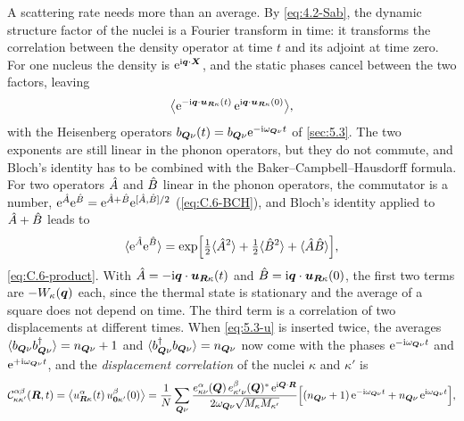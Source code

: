 A scattering rate needs more than an average. By \cref{eq:4.2-Sab}, the dynamic structure factor of the nuclei is a Fourier transform in time: it transforms the correlation between the density operator at time $t$ and its adjoint at time zero. For one nucleus the density is $\mathrm{e}^{\mathrm{i}\bm{q}\cdot\bm{X}}$, and the static phases cancel between the two factors, leaving
\begin{equation*}
  \bigl\langle\mathrm{e}^{-\mathrm{i}\bm{q}\cdot\bm{u}_{\bm{R}\kappa}(t)}\,\mathrm{e}^{\mathrm{i}\bm{q}\cdot\bm{u}_{\bm{R}\kappa}(0)}\bigr\rangle ,
\end{equation*}
with the Heisenberg operators $b_{\bm{Q}\nu}(t) = b_{\bm{Q}\nu}\mathrm{e}^{-\mathrm{i}\omega_{\bm{Q}\nu}t}$ of \cref{sec:5.3}. The two exponents are still linear in the phonon operators, but they do not commute, and Bloch's identity has to be combined with the Baker--Campbell--Hausdorff formula. For two operators $\hat{A}$ and $\hat{B}$ linear in the phonon operators, the commutator is a number, $\mathrm{e}^{\hat{A}}\mathrm{e}^{\hat{B}} = \mathrm{e}^{\hat{A} + \hat{B}}\mathrm{e}^{[\hat{A}, \hat{B}]/2}$ (\cref{eq:C.6-BCH}), and Bloch's identity applied to $\hat{A} + \hat{B}$ leads to
\begin{equation*}
  \langle\mathrm{e}^{\hat{A}}\mathrm{e}^{\hat{B}}\rangle = \exp\Bigl[\tfrac12\langle\hat{A}^2\rangle + \tfrac12\langle\hat{B}^2\rangle + \langle\hat{A}\hat{B}\rangle\Bigr] ,
\end{equation*}
\cref{eq:C.6-product}. With $\hat{A} = -\mathrm{i}\bm{q}\cdot\bm{u}_{\bm{R}\kappa}(t)$ and $\hat{B} = \mathrm{i}\bm{q}\cdot\bm{u}_{\bm{R}\kappa}(0)$, the first two terms are $-W_\kappa(\bm{q})$ each, since the thermal state is stationary and the average of a square does not depend on time. The third term is a correlation of two displacements at different times. When \cref{eq:5.3-u} is inserted twice, the averages $\langle b_{\bm{Q}\nu}b^\dagger_{\bm{Q}\nu}\rangle = n_{\bm{Q}\nu} + 1$ and $\langle b^\dagger_{\bm{Q}\nu}b_{\bm{Q}\nu}\rangle = n_{\bm{Q}\nu}$ now come with the phases $\mathrm{e}^{-\mathrm{i}\omega_{\bm{Q}\nu}t}$ and $\mathrm{e}^{+\mathrm{i}\omega_{\bm{Q}\nu}t}$, and the \emph{displacement correlation} of the nuclei $\kappa$ and $\kappa'$ is
\begin{equation}
  \mathcal{C}^{\alpha\beta}_{\kappa\kappa'}(\bm{R},t) = \bigl\langle u^\alpha_{\bm{R}\kappa}(t)\,u^\beta_{\bm{0}\kappa'}(0)\bigr\rangle
  = \frac1N\sum_{\bm{Q}\nu}\frac{e^\alpha_{\kappa\nu}(\bm{Q})\,e^\beta_{\kappa'\nu}(\bm{Q})^*\,\mathrm{e}^{\mathrm{i}\bm{Q}\cdot\bm{R}}}{2\omega_{\bm{Q}\nu}\sqrt{M_\kappa M_{\kappa'}}}\Bigl[(n_{\bm{Q}\nu} + 1)\,\mathrm{e}^{-\mathrm{i}\omega_{\bm{Q}\nu}t} + n_{\bm{Q}\nu}\,\mathrm{e}^{\mathrm{i}\omega_{\bm{Q}\nu}t}\Bigr] ,
  \label{eq:5.6-C}
\end{equation}
